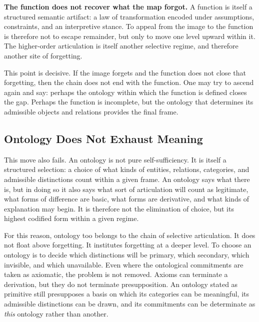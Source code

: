 \documentclass[11pt,a4paper]{article}
\newenvironment{keybox}[1]{%
  \Needspace*{8\baselineskip}%
  \begin{tcolorbox}[
    enhanced,
    breakable=false,
    colback=blue!5,
    colframe=blue!45!black,
    coltitle=black,
    colbacktitle=blue!14,
    boxrule=0.85pt,
    arc=2.5pt,
    left=9pt, right=9pt, top=6pt, bottom=6pt,
    titlerule=0.55pt,
    fonttitle=\bfseries,
    title={#1},
    before upper=\raggedright,
    before skip=0.9\baselineskip,
    after skip=0.9\baselineskip
  ]%
}{%
  \end{tcolorbox}%
}
\theoremstyle{plain}
\theoremstyle{definition}
\theoremstyle{remark}
\begin{document}
\begin{keybox}{The function does not recover what the map forgot}
\textbf{The function does not recover what the map forgot.} A function is itself a structured semantic artifact: a law of transformation encoded under assumptions, constraints, and an interpretive stance. To appeal from the image to the function is therefore not to escape remainder, but only to move one level upward within it. The higher-order articulation is itself another selective regime, and therefore another site of forgetting.
\end{keybox}

This point is decisive. If the image forgets and the function does not close that forgetting, then the chain does not end with the function. One may try to ascend again and say: perhaps the ontology within which the function is defined closes the gap. Perhaps the function is incomplete, but the ontology that determines its admissible objects and relations provides the final frame.

\subsection{Ontology Does Not Exhaust Meaning}

This move also fails. An ontology is not pure self-sufficiency. It is itself a structured selection: a choice of what kinds of entities, relations, categories, and admissible distinctions count within a given frame. An ontology says what there is, but in doing so it also says what sort of articulation will count as legitimate, what forms of difference are basic, what forms are derivative, and what kinds of explanation may begin. It is therefore not the elimination of choice, but its highest codified form within a given regime.

For this reason, ontology too belongs to the chain of selective articulation. It does not float above forgetting. It institutes forgetting at a deeper level. To choose an ontology is to decide which distinctions will be primary, which secondary, which invisible, and which unavailable. Even where the ontological commitments are taken as axiomatic, the problem is not removed. Axioms can terminate a derivation, but they do not terminate presupposition. An ontology stated as primitive still presupposes a basis on which its categories can be meaningful, its admissible distinctions can be drawn, and its commitments can be determinate as \emph{this} ontology rather than another.
\end{document}
